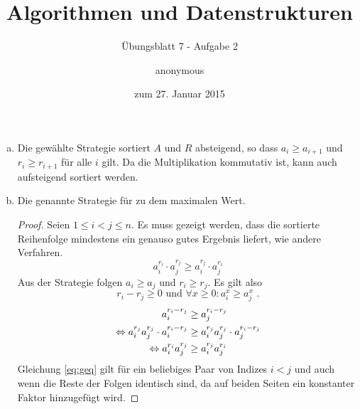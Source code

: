 \documentclass[a4paper]{scrartcl}
\title{Algorithmen und Datenstrukturen}
\subtitle{Übungsblatt 7 - Aufgabe 2}
\author{
    anonymous
}
\date{zum 27. Januar 2015}
\begin{document}
\maketitle

\begin{enumerate}[(a)]
    \item 
        Die gewählte Strategie sortiert $A$ und $R$ absteigend, so dass
        $a_i \geq a_{i+1}$ und $r_i \geq r_{i+1}$ für alle $i$ gilt.
        Da die Multiplikation kommutativ ist, kann auch aufsteigend sortiert
        werden.

    \item
        \begin{behaupt}
            Die genannte Strategie für zu dem maximalen Wert.
        \end{behaupt}
        \begin{proof}
            Seien $1 \leq i < j \leq n$.
            Es muss gezeigt werden, dass die sortierte Reihenfolge mindestens
            ein genauso gutes Ergebnis liefert, wie andere Verfahren.
            \begin{equation}
                a_i^{r_i} \cdot a_j^{r_j} \geq a_i^{r_j} \cdot a_j^{r_i}
                \label{eq:geq}
            \end{equation}
            Aus der Strategie folgen $a_i \geq a_j$ und $r_i \geq r_j$.
            Es gilt also
            \begin{equation}
                r_i - r_j \geq 0
                \text{ und }
                \forall x \geq 0 : a_i^x \geq a_j^x
                \text{ .}
            \end{equation}
            \begin{equation}
                \begin{split}
                    a_i^{r_i - r_j} &\geq a_j^{r_i - r_j} \\
                    \Leftrightarrow a_i^{r_j} a_j^{r_j} \cdot a_i^{r_i - r_j}
                    &\geq a_i^{r_j} a_j^{r_j} \cdot a_j^{r_i - r_j} \\
                    \Leftrightarrow a_i^{r_i} a_j^{r_j} &\geq a_i^{r_j} a_j^{r_i}
                \end{split}
            \end{equation}
            Gleichung \eqref{eq:geq} gilt für ein beliebiges Paar von Indizes
            $i < j$ und auch wenn die Reste der Folgen identisch sind, da auf
            beiden Seiten ein konstanter Faktor hinzugefügt wird.


            

            
        \end{proof}

\end{enumerate}
\end{document}
